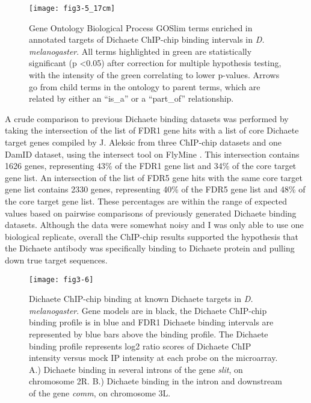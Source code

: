 \begin{figure}
\centering
\texttt{[image: fig3-5\_17cm]}
\caption[Gene Ontology Biological Process GOSlim terms enriched in annotated targets of Dichaete ChIP-chip binding intervals in \emph{D. melanogaster}]{Gene Ontology Biological Process GOSlim terms enriched in annotated targets of Dichaete ChIP-chip binding intervals in \emph{D. melanogaster}. All terms highlighted in green are statistically significant (p \textless 0.05) after correction for multiple hypothesis testing, with the intensity of the green correlating to lower p-values. Arrows go from child terms in the ontology to parent terms, which are related by either an “is\_a” or a “part\_of” relationship.}
\label{Figure 3.5}
\end{figure}

A crude comparison to previous Dichaete binding datasets was performed by taking the intersection of the list of FDR1 gene hits with a list of core Dichaete target genes compiled by J. Aleksic from three ChIP-chip datasets and one DamID dataset, using the intersect tool on FlyMine \citep{aleksic_role_2013,lyne_flymine:_2007}. This intersection contains 1626 genes, representing 43\% of the FDR1 gene list and 34\% of the core target gene list. An intersection of the list of FDR5 gene hits with the same core target gene list contains 2330 genes, representing 40\% of the FDR5 gene list and 48\% of the core target gene list. These percentages are within the range of expected values based on pairwise comparisons of previously generated Dichaete binding datasets. Although the data were somewhat noisy and I was only able to use one biological replicate, overall the ChIP-chip results supported the hypothesis that the Dichaete antibody was specifically binding to Dichaete protein and pulling down true target sequences.

\begin{figure}
\centering
\texttt{[image: fig3-6]}
\caption[Dichaete ChIP-chip binding at known Dichaete targets in \emph{D. melanogaster}]{Dichaete ChIP-chip binding at known Dichaete targets in \emph{D. melanogaster}. Gene models are in black, the Dichaete ChIP-chip binding profile is in blue and FDR1 Dichaete binding intervals are represented by blue bars above the binding profile. The Dichaete binding profile represents log2 ratio scores of Dichaete ChIP intensity versus mock IP intensity at each probe on the microarray. A.) Dichaete binding in several introns of the gene \emph{slit}, on chromosome 2R. B.) Dichaete binding in the intron and downstream of the gene \emph{comm}, on chromosome 3L.}
\label{Figure 3.6}
\end{figure}

